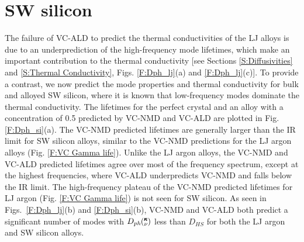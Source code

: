 \documentclass[12pt,twocolumn,iop]{/usr/share/texmf/tex/latex/iop/iopart}[/usr/share/texmf/tex/latex/iop/]
\newcommand{\kv}{\mspace{-4.0mu}\left(\mspace{-8.0mu}
\begin{smallmatrix}&\pmb{\kappa} \\&\nu\end{smallmatrix}
\mspace{-3.0mu}\right)}
\begin{document}

\clearpage

\section{\label{S:SW}SW silicon}

The failure of VC-ALD to predict the thermal conductivities of the LJ 
alloys is due to an underprediction of the high-frequency mode lifetimes, 
which make an important contribution to the thermal conductivity 
[see Sections \ref{S:Diffusivities} and \ref{S:Thermal Conductivity}, 
Figs. \ref{F:Dph_lj}(a) and \ref{F:Dph_lj}(c)]. To provide a contrast, 
we now predict the mode properties and thermal conductivity for bulk 
and alloyed SW silicon, where it is known that low-frequency modes 
dominate the thermal conductivity.
\cite{sellan_size_2010,sellan_cross-plane_2010} 
The lifetimes for the perfect crystal and an alloy with a concentration of 
0.5 predicted by VC-NMD and VC-ALD are plotted in Fig. \ref{F:Dph_si}(a). 
The VC-NMD predicted lifetimes are generally larger than 
the IR limit for SW silicon alloys, similar 
to the VC-NMD predictions for the LJ argon alloys 
(Fig. \ref{F:VC Gamma life}). Unlike the 
LJ argon alloys, the  
VC-NMD and VC-ALD predicted lifetimes agree over most 
of the frequency spectrum, except at the highest frequencies, where 
VC-ALD underpredicts VC-NMD and falls below the IR limit. 
The high-frequency plateau of the VC-NMD predicted lifetimes 
for LJ argon (Fig. \ref{F:VC Gamma life}) is not seen for SW silicon. 
As seen in Figs.~\ref{F:Dph_lj}(b) 
and \ref{F:Dph_si}(b), VC-NMD and VC-ALD both predict a significant 
number of modes with  
$D_{ph}\kv$ less than $D_{HS}$ for both the LJ argon and 
SW silicon alloys. 
\end{document}
